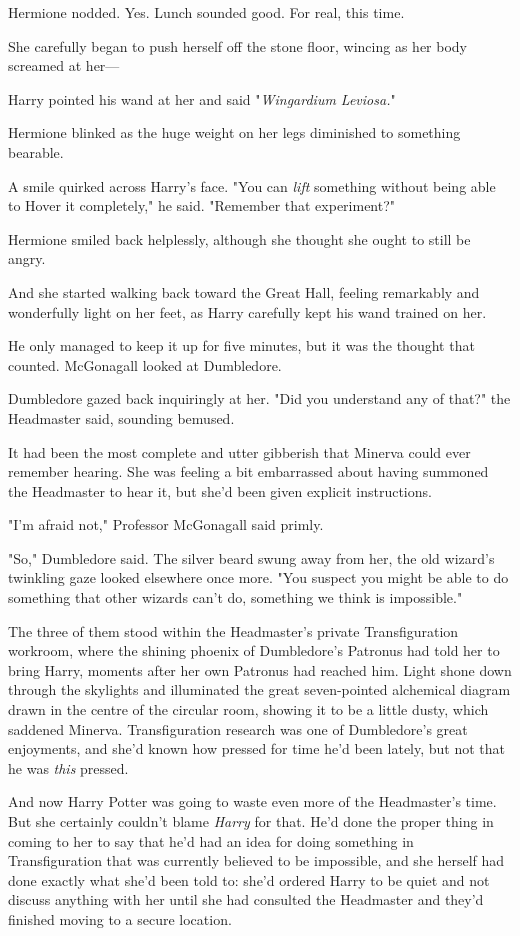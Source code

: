 Hermione nodded. Yes. Lunch sounded good. For real, this time.

She carefully began to push herself off the stone floor, wincing as her body
screamed at her---

Harry pointed his wand at her and said "\emph{Wingardium Leviosa.}"

Hermione blinked as the huge weight on her legs diminished to something
bearable.

A smile quirked across Harry's face. "You can \emph{lift} something without
being able to Hover it completely," he said. "Remember that experiment?"

Hermione smiled back helplessly, although she thought she ought to still be
angry.

And she started walking back toward the Great Hall, feeling remarkably and
wonderfully light on her feet, as Harry carefully kept his wand trained on her.

He only managed to keep it up for five minutes, but it was the thought that
counted.
\later
McGonagall looked at Dumbledore.

Dumbledore gazed back inquiringly at her. "Did you understand any of that?" the
Headmaster said, sounding bemused.

It had been the most complete and utter gibberish that Minerva could ever
remember hearing. She was feeling a bit embarrassed about having summoned the
Headmaster to hear it, but she'd been given explicit instructions.

"I'm afraid not," Professor McGonagall said primly.

"So," Dumbledore said. The silver beard swung away from her, the old wizard's
twinkling gaze looked elsewhere once more. "You suspect you might be able to do
something that other wizards can't do, something we think is impossible."

The three of them stood within the Headmaster's private Transfiguration
workroom, where the shining phoenix of Dumbledore's Patronus had told her to
bring Harry, moments after her own Patronus had reached him. Light shone down
through the skylights and illuminated the great seven-pointed alchemical
diagram drawn in the centre of the circular room, showing it to be a little
dusty, which saddened Minerva. Transfiguration research was one of Dumbledore's
great enjoyments, and she'd known how pressed for time he'd been lately, but
not that he was \emph{this} pressed.

And now Harry Potter was going to waste even more of the Headmaster's time. But
she certainly couldn't blame \emph{Harry} for that. He'd done the proper thing
in coming to her to say that he'd had an idea for doing something in
Transfiguration that was currently believed to be impossible, and she herself
had done exactly what she'd been told to: she'd ordered Harry to be quiet
and not discuss anything with her until she had consulted the Headmaster and
they'd finished moving to a secure location.


